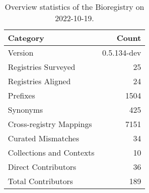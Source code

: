 \begin{table}
\centering
\caption{Overview statistics of the Bioregistry on 2022-10-19.}
\label{tab:bioregistry-summary}
\begin{tabular}{lr}
\toprule
                Category &       Count \\
\midrule
                 Version & 0.5.134-dev \\
     Registries Surveyed &          25 \\
      Registries Aligned &          24 \\
                Prefixes &        1504 \\
                Synonyms &         425 \\
 Cross-registry Mappings &        7151 \\
      Curated Mismatches &          34 \\
Collections and Contexts &          10 \\
     Direct Contributors &          36 \\
      Total Contributors &         189 \\
\bottomrule
\end{tabular}
\end{table}
